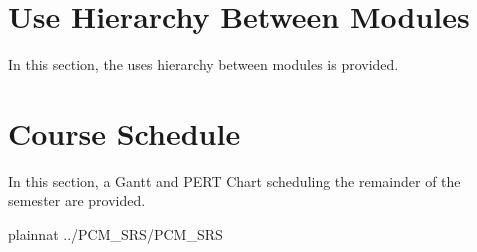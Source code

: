 \documentclass[12pt]{article}
\begin{document}
\section{Use Hierarchy Between Modules} \label{SecUse}

In this section, the uses hierarchy between modules is
provided.



\section{Course Schedule} 

In this section, a Gantt and PERT Chart scheduling the remainder of the semester are provided.





 {plainnat}
 {../PCM_SRS/PCM_SRS}
\end{document}
